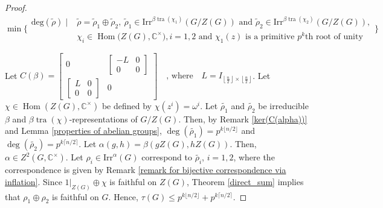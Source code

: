 \documentclass[a4paper,11pt]{amsart}
\numberwithin{equation}{section}
\numberwithin{equation}{subsection}
\newcommand{\C}{\mathbb{C}}
\newcommand{\tg}{\tau(G)}
\newcommand{\irr}{\mathrm{Irr}}
\newcommand{\tra}{\operatorname{tra}}
\begin{document}
\begin{proof}
	\[\operatorname{min}\Biggl\{
	\begin{array}{cl}  \mathrm{deg}(\tilde{\rho}) \mid & \tilde{\rho}=\tilde{\rho}_1 \oplus \tilde{\rho}_2,\ \tilde{\rho}_1 \in \irr^{\beta\tra(\chi_1)}(G/Z(G)) \text{ and }\tilde{\rho}_2 \in \mathrm{Irr}^{\beta \tra(\chi_2)}(G/Z(G)), \\
		& \chi_i \in  \operatorname{Hom}\big(Z(G),\mathbb{C}^{\times}\big), i=1,2 \text{ and } \chi_1(z) \text{ is a primitive } p^k\text{th root of unity} 
	\end{array}
	\Bigg\}\] 

	
	Let $C(\beta)=
	\begin{bmatrix}
		0 & 
		\begin{bmatrix}
			-L & 0 \\[4pt]
			0 & 0
		\end{bmatrix}
		\\[10pt]
		\begin{bmatrix}
			L & 0 \\[4pt]
			0 & 0
		\end{bmatrix}
		& 0
	\end{bmatrix}
	\quad \text{, where} \quad L = I_{\left\lfloor \frac{n}{2} \right\rfloor \times \left\lfloor \frac{n}{2} \right\rfloor}$. Let $\chi \in  \operatorname{Hom}(Z(G),\mathbb{C}^{\times})$ be defined by $\chi(z^i)= \omega^{i}$. Let $\tilde{\rho_1}$ and $\tilde{\rho_2}$ be irreducible $\beta$ and $\beta\tra(\chi)$-representations of $G/Z(G)$. Then, by Remark \ref{ker(C(alpha))} and Lemma \ref{properties of abelian groups}, $\deg(\tilde{\rho_1}) = p^{k{\lfloor{n/2}\rfloor}}$ and $\deg(\tilde{\rho_2})= p^{k{\lceil{n/2}\rceil}}$. 
	Let $\alpha(g,h) = \beta(gZ(G), hZ(G))$. Then, $\alpha \in Z^2(G, \C^\times)$. Let $\rho_i \in \irr^\alpha(G)$ correspond to $\tilde{\rho_i}$, $i=1,2$, where the correspondence is given by Remark \ref{remark for bijective correspondence via inflation}. Since $1|_{Z(G)} \oplus \chi$ is faithful on $Z(G)$, Theorem \ref{direct_sum} implies that $\rho_1 \oplus \rho_2$ is faithful on $G$. Hence, $\tg \leq p^{k{\lfloor{n/2}\rfloor}} + p^{k{\lceil{n/2}\rceil}}$. 
\end{proof}
\end{document}

